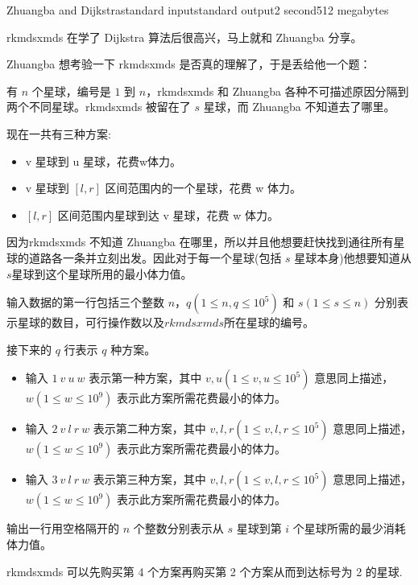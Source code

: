\begin{problem}{Zhuangba and Dijkstra}{standard input}{standard output}{2 second}{512 megabytes}

rkmdsxmds 在学了 Dijkstra 算法后很高兴，马上就和 Zhuangba 分享。

Zhuangba 想考验一下 rkmdsxmds 是否真的理解了，于是丢给他一个题：

有 $n$ 个星球，编号是 $1$ 到 $n$，rkmdsxmds 和 Zhuangba 各种不可描述原因分隔到两个不同星球。rkmdsxmds 被留在了 $s$ 星球，而 Zhuangba 不知道去了哪里。

现在一共有三种方案:

\begin{itemize}
\item v 星球到 u 星球，花费w体力。
\item v 星球到 $\left[l, r\right]$ 区间范围内的一个星球，花费 w 体力。
\item $\left[l, r\right]$ 区间范围内星球到达 v 星球，花费 w 体力。
\end{itemize}

因为rkmdsxmds 不知道 Zhuangba 在哪里，所以并且他想要赶快找到通往所有星球的道路各一条并立刻出发。因此对于每一个星球(包括 $s$ 星球本身)他想要知道从$s$星球到这个星球所用的最小体力值。

\InputFile

输入数据的第一行包括三个整数 $n$，$q(1\le n , q \le 10^5)$ 和 $s(1\le s \le n)$ 分别表示星球的数目，可行操作数以及$rkmdsxmds$所在星球的编号。

接下来的 $q$ 行表示 $q$ 种方案。

\begin{itemize}
\item 输入 $1\ v\ u\ w$  表示第一种方案，其中 $v,u(1\le v, u\le 10^5)$ 意思同上描述，$w(1\le w \le 10^9)$ 表示此方案所需花费最小的体力。
\item 输入 $2\ v\ l\ r\ w$ 表示第二种方案，其中 $v,l,r(1\le v , l , r \le 10^5)$ 意思同上描述，$w(1\le w \le 10^9)$ 表示此方案所需花费最小的体力。
\item 输入 $3\ v\ l\ r\ w$ 表示第三种方案，其中 $v,l,r(1\le v , l , r \le 10^5)$ 意思同上描述，$w(1\le w \le 10^9)$ 表示此方案所需花费最小的体力。
\end{itemize}

\OutputFile

输出一行用空格隔开的 $n$ 个整数分别表示从 $s$ 星球到第 $i$ 个星球所需的最少消耗体力值。

\Example

\begin{example}
%
\end{example}

\Notes

rkmdsxmds 可以先购买第 4 个方案再购买第 2 个方案从而到达标号为 2 的星球.

\end{problem}
